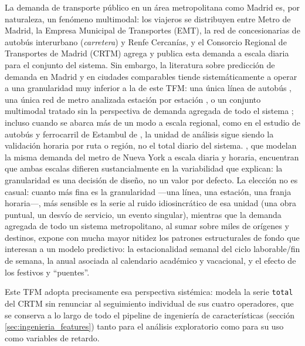 La demanda de transporte público en un área metropolitana como Madrid es, por
naturaleza, un fenómeno multimodal: los viajeros se distribuyen entre Metro de Madrid, la
Empresa Municipal de Transportes (EMT), la red de concesionarias de autobús interurbano
(\emph{carretera}) y Renfe Cercanías, y el Consorcio Regional de Transportes de Madrid
(CRTM) agrega y publica esta demanda a escala diaria para el conjunto del sistema. Sin
embargo, la literatura sobre predicción de demanda en Madrid y en ciudades comparables
tiende sistemáticamente a operar a una granularidad muy inferior a la de este TFM: una
única línea de autobús \parencite{monje2022deep}, una única red de metro analizada
estación por estación \parencite{cardozo2012spatial}, o un conjunto multimodal tratado sin
la perspectiva de demanda agregada de todo el sistema \parencite{toque2017short}; incluso
cuando se abarca más de un modo a escala regional, como en el estudio de autobús y
ferrocarril de Estambul de \textcite{yazicioglu2025passenger}, la unidad de análisis sigue
siendo la validación horaria por ruta o región, no el total diario del sistema.
\textcite{singhal2014weather}, que modelan la misma demanda del metro de Nueva York a
escala diaria y horaria, encuentran que ambas escalas difieren sustancialmente en la
variabilidad que explican: la granularidad es una decisión de diseño, no un valor por
defecto. La elección no es casual: cuanto más fina es la granularidad —una línea, una
estación, una franja horaria—, más sensible es la serie al ruido idiosincrático de esa
unidad (una obra puntual, un desvío de servicio, un evento singular), mientras que la
demanda agregada de todo un sistema metropolitano, al sumar sobre miles de orígenes y
destinos, expone con mucha mayor nitidez los patrones estructurales de fondo que
interesan a un modelo predictivo: la estacionalidad semanal del ciclo laborable/fin de
semana, la anual asociada al calendario académico y vacacional, y el efecto de los
festivos y ``puentes''.

Este TFM adopta precisamente esa perspectiva sistémica: modela la serie \texttt{total}
del CRTM sin renunciar al seguimiento individual de sus cuatro operadores, que se
conserva a lo largo de todo el pipeline de ingeniería de características (sección
\ref{sec:ingenieria_features}) tanto para el análisis exploratorio como para su uso como
variables de retardo.

